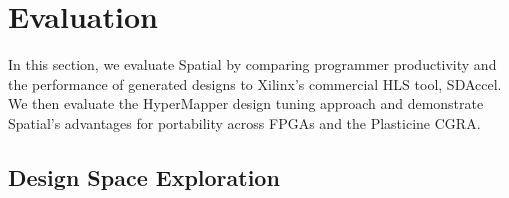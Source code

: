 \section{Evaluation}
\label{evaluation}

In this section, we evaluate Spatial by comparing programmer productivity and the performance of generated designs to Xilinx's commercial HLS tool, SDAccel. We then evaluate the HyperMapper design tuning approach and demonstrate Spatial's advantages for portability across FPGAs and the Plasticine CGRA.





\subsection{Design Space Exploration}




